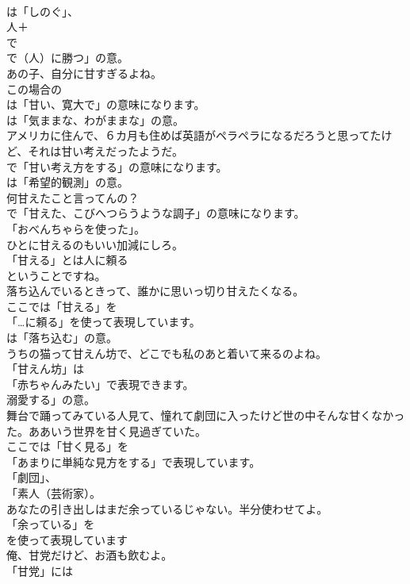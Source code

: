 \documentclass[8pt]{extreport}
\begin{document}
\begin{CJK}{UTF8}{min}
\\	は「しのぐ」、
\\	人＋
\\	で
\\	で（人）に勝つ」の意。	
\\	あの子、自分に甘すぎるよね。 
\\	この場合の 
\\	は「甘い、寛大で」の意味になります。
\\	は「気ままな、わがままな」の意。	
\\	アメリカに住んで、６カ月も住めば英語がペラペラになるだろうと思ってたけど、それは甘い考えだったようだ。 
\\	で「甘い考え方をする」の意味になります。
\\	は「希望的観測」の意。	
\\	何甘えたこと言ってんの？ 
\\	で「甘えた、こびへつらうような調子」の意味になります。
\\	「おべんちゃらを使った」。	
\\	ひとに甘えるのもいい加減にしろ。 
\\	「甘える」とは人に頼る
\\	ということですね。	
\\	落ち込んでいるときって、誰かに思いっ切り甘えたくなる。 
\\	ここでは「甘える」を 
\\	「…に頼る」を使って表現しています。
\\	は「落ち込む」の意。	
\\	うちの猫って甘えん坊で、どこでも私のあと着いて来るのよね。 
\\	「甘えん坊」は
\\	「赤ちゃんみたい」で表現できます。
\\	溺愛する」の意。	
\\	舞台で踊ってみている人見て、憧れて劇団に入ったけど世の中そんな甘くなかった。ああいう世界を甘く見過ぎていた。 
\\	ここでは「甘く見る」を
\\	「あまりに単純な見方をする」で表現しています。
\\	「劇団」、
\\	「素人（芸術家）。	
\\	あなたの引き出しはまだ余っているじゃない。半分使わせてよ。 
\\	「余っている」を 
\\	を使って表現しています	
\\	俺、甘党だけど、お酒も飲むよ。 
\\	「甘党」には

\end{CJK}
\end{document}

